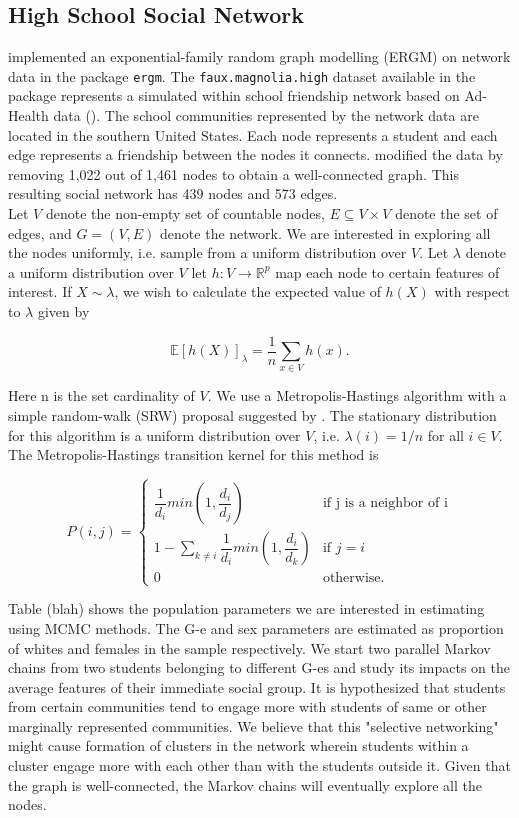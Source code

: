 \documentclass[11pt]{article}
\theoremstyle{remark}
\begin{document}
\subsection{High School Social Network}

\cite{handcock2008statnet} implemented an exponential-family random graph modelling (ERGM) on network data in the package \texttt{ergm}. The \texttt{faux.magnolia.high} dataset available in the package represents a simulated within school friendship network based on Ad-Health data (\cite{resnick1997protecting}). The school communities represented by the network data are located in the southern United States. Each node represents a student and each edge represents a friendship between the nodes it connects. \cite{nilakanta2019ensuring} modified the data by removing 1,022 out of 1,461 nodes to obtain a well-connected graph. This resulting social network has 439 nodes and 573 edges.\\

Let $V$ denote the non-empty set of countable nodes, $E \subseteq V \times V$ denote the set of edges, and $G = (V,E)$ denote the network. We are interested in exploring all the nodes uniformly, i.e. sample from a uniform distribution over $V$. Let $\lambda$ denote a uniform distribution over $V$  let $h: V \to \mathbb{R}^p$ map each node to certain features of interest. If $X \sim \lambda$, we wish to calculate the expected value of $h(X)$ with respect to $\lambda$ given by

\[
\mathbb{E}[h(X)]_{\lambda} = \dfrac{1}{n}\sum_{x \in V}h(x).
\]

Here n is the set cardinality of $V$. We use a Metropolis-Hastings algorithm with a simple random-walk (SRW) proposal suggested by \cite{gjoka2011practical}. The stationary distribution for this algorithm is a uniform distribution over $V$, i.e. $\lambda(i) = 1/n$ for all $i \in V$.  The Metropolis-Hastings transition kernel for this method is

\[
P(i,j) = \left \{
        \begin{array}{cc}
             \dfrac{1}{d_i} min\left(1, \dfrac{d_i}{d_j}\right) & \textrm{if j is a neighbor of i}  \\
             1 - \sum_{k \neq i} \dfrac{1}{d_i} min\left(1, \dfrac{d_i}{d_k}\right) & \textrm{if } j = i\\
             0 & \textrm{otherwise}.
        \end{array}
\right.
\]

Table (blah) shows the population parameters we are interested in estimating using MCMC methods.  The G-e and sex parameters are estimated as proportion of whites and females in the sample respectively. We start two parallel Markov chains from two students belonging to different G-es and study its impacts on the average features of their immediate social group. It is hypothesized that students from certain communities tend to engage more with students of same or other marginally represented communities. We believe that this "selective networking" might cause formation of clusters in the network wherein students within a cluster engage more with each other than with the students outside it. Given that the graph is well-connected, the Markov chains will eventually explore all the nodes. 


\singlespacing


\end{document}
